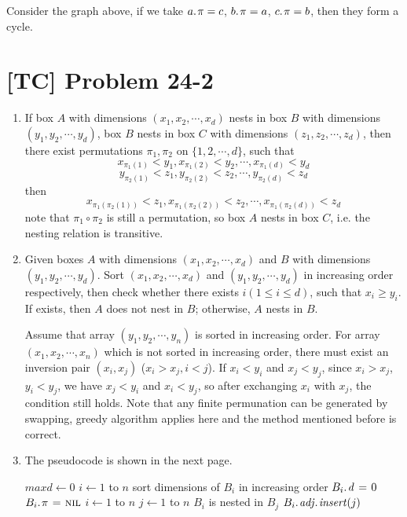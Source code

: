 \documentclass[a4paper,11pt,twocolumn]{article}
\newcommand{\NIL}{\const{nil}}
\begin{document}
  Consider the graph above, if we take $\attrib{a}{\pi} = c$, $\attrib{b}{\pi} = a$, $\attrib{c}{\pi} = b$, then they form a cycle.
  
  \section{[TC] Problem 24-2}
  \begin{enumerate}
  \item If box $A$ with dimensions $(x_1, x_2, \cdots, x_d)$ nests in box $B$ with dimensions $(y_1, y_2, \cdots, y_d)$, box $B$ nests in box $C$ with dimensions $(z_1, z_2, \cdots, z_d)$, then there exist permutations $\pi_1, \pi_2$ on $\{1, 2, \cdots, d\}$, such that
  $$ x_{\pi_1(1)} < y_1, x_{\pi_1(2)} < y_2, \cdots, x_{\pi_1(d)} < y_d $$
  $$ y_{\pi_2(1)} < z_1, y_{\pi_2(2)} < z_2, \cdots, y_{\pi_2(d)} < z_d $$
  then
  $$ x_{\pi_1(\pi_2(1))} < z_1, x_{\pi_1(\pi_2(2))} < z_2, \cdots, x_{\pi_1(\pi_2(d))} < z_d $$
  note that $\pi_1 \circ \pi_2$ is still a permutation, so box $A$ nests in box $C$, i.e. the nesting relation is transitive.
  \item Given boxes $A$ with dimensions $(x_1, x_2, \cdots, x_d)$ and $B$ with dimensions $(y_1, y_2, \cdots, y_d)$. Sort $(x_1, x_2, \cdots, x_d)$ and $(y_1, y_2, \cdots, y_d)$ in increasing order respectively, then check whether there exists $i (1 \leq i \leq d)$, such that $x_i \geq y_i$. If exists, then $A$ does not nest in $B$; otherwise, $A$ nests in $B$. \par
  Assume that array $(y_1, y_2, \cdots, y_n)$ is sorted in increasing order. For array $(x_1, x_2, \cdots, x_n)$ which is not sorted in increasing order, there must exist an inversion pair $(x_i, x_j)$ ($x_i>x_j, i<j$). If $x_i < y_i$ and $x_j < y_j$, since $x_i > x_j$, $y_i < y_j$, we have $x_j < y_i$ and $x_i < y_j$, so after exchanging $x_i$ with $x_j$, the condition still holds. Note that any finite permunation can be generated by swapping, greedy algorithm applies here and the method mentioned before is correct.
  \item The pseudocode is shown in the next page.
  \begin{codebox}
  \li $maxd \gets 0$
  \li \For $i \gets 1$ to $n$
  \li \Do  sort dimensions of $B_i$ in increasing order
  \li      $\attrib{B_i}{d} \gets 0$
  \li      $\attrib{B_i}{\pi} \gets \NIL$
      \End
  \li \For $i \gets 1$ to $n$
  \li \Do  \For $j \gets 1$ to $n$
  \li      \Do  \If $B_i$ is nested in $B_j$
  \li           \Do $\attribb{B_i}{adj}{insert}(j)$

\end{codebox}
\end{enumerate}
\end{document}
